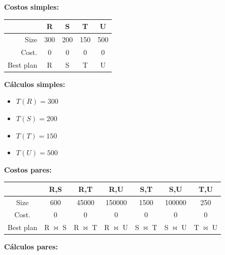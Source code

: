 \documentclass{templateNote}
\begin{document}
\begin{enumerate}
    \vspace*{0.5cm}
    \textbf{Costos simples:}
    \begin{center}
        \begin{tabular}{|r|c|c|c|c|}
            \hline
            & R & S & T & U\\
            \hline
            Size & 300 & 200 & 150 & 500 \\
            \hline
            Cost. & 0 & 0 & 0 & 0 \\
            \hline
            Best plan & R & S & T & U \\
            \hline
        \end{tabular}
    \end{center}

    \textbf{Cálculos simples:}
    \begin{itemize}
        \item $T(R) = 300$
        \item $T(S) = 200$
        \item $T(T) = 150$
        \item $T(U) = 500$
    \end{itemize}

    \textbf{Costos pares:}
    \begin{center}
        \begin{tabular}{|c|c|c|c|c|c|c|}
            \hline
            & R,S & R,T & R,U & S,T & S,U & T,U\\
            \hline
            Size & 600 & 45000 & 150000 & 1500 & 100000 & 250 \\
            \hline
            Cost. & 0 & 0 & 0 & 0 & 0 & 0  \\
            \hline
            Best plan & R $\bowtie$ S & R $\bowtie$ T & R $\bowtie$ U & S $\bowtie$ T & S $\bowtie$ U & T $\bowtie$ U\\
            \hline
        \end{tabular}
    \end{center}

    \textbf{Cálculos pares:}


\end{enumerate}
\end{document}
